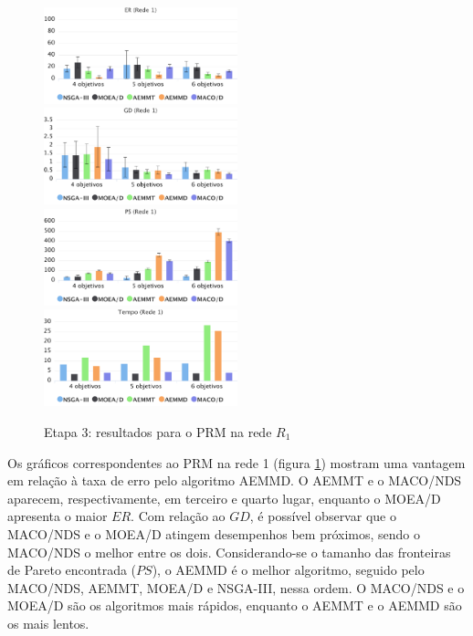 \begin{figure}[!htbp]
	\caption{Etapa 3: resultados para o PRM na rede $R_1$}
	\label{fig_exp3_prm_r1}
	\includegraphics[width=0.5\textwidth]{cap_experimentos/figs/etapa3/er-mrp-r1}
	\includegraphics[width=0.5\textwidth]{cap_experimentos/figs/etapa3/gd-mrp-r1}
	\includegraphics[width=0.5\textwidth]{cap_experimentos/figs/etapa3/ps-mrp-r1}
	\includegraphics[width=0.5\textwidth]{cap_experimentos/figs/etapa3/time-mrp-r1}
\end{figure}

Os gráficos correspondentes ao PRM na rede 1 (figura \ref{fig_exp3_prm_r1}) mostram uma vantagem em relação à taxa de erro pelo algoritmo AEMMD. O AEMMT e o MACO/NDS aparecem, respectivamente, em terceiro e quarto lugar, enquanto o MOEA/D apresenta o maior $ER$. Com relação ao $GD$, é possível observar que o MACO/NDS e o MOEA/D atingem desempenhos bem próximos, sendo o MACO/NDS o melhor entre os dois. Considerando-se o tamanho das fronteiras de Pareto encontrada ($PS$), o AEMMD é o melhor algoritmo, seguido pelo MACO/NDS, AEMMT, MOEA/D e NSGA-III, nessa ordem. O MACO/NDS e o MOEA/D são os algoritmos mais rápidos, enquanto o AEMMT e o AEMMD são os mais lentos.

